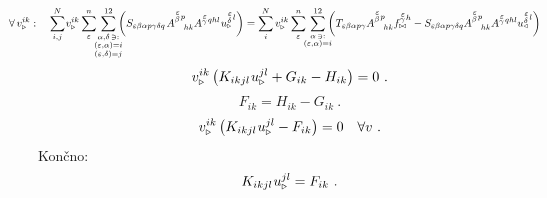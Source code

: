 \begin{equation}
   \hspace{-10mm}
   \forall \, v^{ik}_{\triangleright}: \quad
   \sum^N_{i,j} \mkern-2mu v^{i k}_{\triangleright}
   \sum^n_\varepsilon
   \mkern-7mu
   \sum_{\substack{\alpha, \delta \, \ni: \\ (\varepsilon,\alpha) = i \\ (\varepsilon,\delta) = j}}^{12}
   \mkern-10mu
   \left(
   S_{\varepsilon \beta \alpha p \gamma \delta q} \mkern2mu
   A^{\substack{\mkern2mu \varepsilon \\[0.15mm] \beta} \mkern2mu p}_{\mkern19mu hk}    A^{\substack{\mkern2mu \varepsilon \\[-0.4mm] \gamma} \mkern2mu qhl} \mkern1mu     u^{\substack{\mkern2mu \varepsilon \\[0.2mm] \delta} \mkern2mu l}_\triangleright \right)
   =
   \sum^N_i v^{i k}_{\triangleright}
   \sum^n_\varepsilon
   \mkern-7mu
   \sum_{\substack{\alpha \, \ni: \\ (\varepsilon,\alpha) = i}}^{12}
   \mkern-10mu
   \left(
   T_{\varepsilon \beta \alpha p \gamma}
   A^{\substack{\mkern2mu \varepsilon \\[0.15mm] \beta} \mkern2mu p}_{\mkern19mu hk}    f^{\substack{\mkern2mu \varepsilon \\[-0.4mm] \gamma} \mkern2mu h}_{\bowtie}
   -
   S_{\varepsilon \beta \alpha p \gamma \delta q}    A^{\substack{\mkern2mu \varepsilon \\[0.15mm] \beta} \mkern2mu p}_{\mkern19mu hk}    A^{\substack{\mkern2mu \varepsilon \\[-0.4mm] \gamma} \mkern2mu qhl}    u^{\substack{\mkern2mu \varepsilon \\[0.2mm] \delta} \mkern2mu l}_\triangleleft
   \right)
\end{equation}
\begin{equation*}
   v^{i k}_{\triangleright} \left(
   K_{i k j l} \mkern1mu u^{j l}_\triangleright
   +
   G_{i k}
   -
   H_{i k}
   \right) = 0 \ .
\end{equation*}
\begin{equation*}
   F_{i k} = H_{i k} - G_{i k} \ .
\end{equation*}
\begin{equation*}
   v^{i k}_{\triangleright} \left(
   K_{i k j l} \mkern1mu u^{j l}_\triangleright
   -
   F_{i k}
   \right) = 0 \quad \forall v \ .
\end{equation*}
Končno:
\begin{equation}
   K_{i k j l} \mkern1mu u^{j l}_\triangleright
   =
   F_{i k} \ .
\end{equation}
